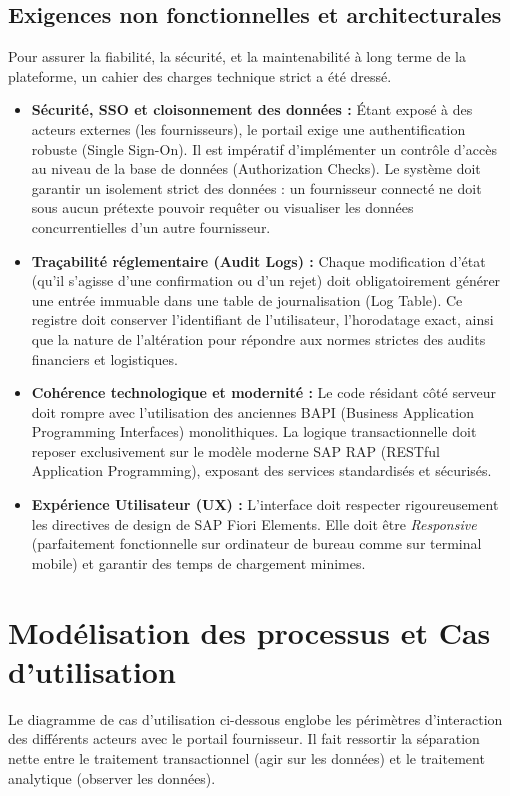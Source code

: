 \documentclass[12pt,a4paper,oneside]{report}
\begin{document}
\subsection{Exigences non fonctionnelles et architecturales}\label{ch4:besoins-nf}
Pour assurer la fiabilité, la sécurité, et la maintenabilité à long terme de la plateforme, un cahier des charges technique strict a été dressé.

\begin{itemize}[label=-]
    \item \textbf{Sécurité, SSO et cloisonnement des données :} Étant exposé à des acteurs externes (les fournisseurs), le portail exige une authentification robuste (Single Sign-On). Il est impératif d'implémenter un contrôle d'accès au niveau de la base de données (Authorization Checks). Le système doit garantir un isolement strict des données : un fournisseur connecté ne doit sous aucun prétexte pouvoir requêter ou visualiser les données concurrentielles d'un autre fournisseur.
    \item \textbf{Traçabilité réglementaire (Audit Logs) :} Chaque modification d'état (qu'il s'agisse d'une confirmation ou d'un rejet) doit obligatoirement générer une entrée immuable dans une table de journalisation (Log Table). Ce registre doit conserver l'identifiant de l'utilisateur, l'horodatage exact, ainsi que la nature de l'altération pour répondre aux normes strictes des audits financiers et logistiques.
    \item \textbf{Cohérence technologique et modernité :} Le code résidant côté serveur doit rompre avec l'utilisation des anciennes BAPI (Business Application Programming Interfaces) monolithiques. La logique transactionnelle doit reposer exclusivement sur le modèle moderne SAP RAP (RESTful Application Programming), exposant des services standardisés et sécurisés.
    \item \textbf{Expérience Utilisateur (UX) :} L'interface doit respecter rigoureusement les directives de design de SAP Fiori Elements. Elle doit être \textit{Responsive} (parfaitement fonctionnelle sur ordinateur de bureau comme sur terminal mobile) et garantir des temps de chargement minimes.
\end{itemize}

\section{Modélisation des processus et Cas d'utilisation}\label{ch4:cas-util}
Le diagramme de cas d'utilisation ci-dessous englobe les périmètres d'interaction des différents acteurs avec le portail fournisseur. Il fait ressortir la séparation nette entre le traitement transactionnel (agir sur les données) et le traitement analytique (observer les données).
\end{document}
